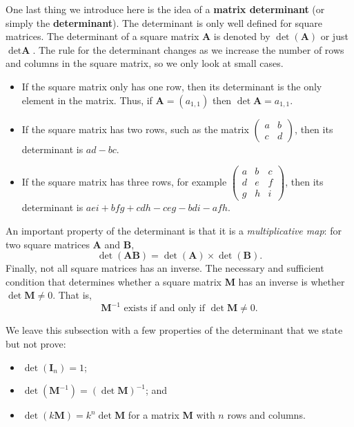 One last thing we introduce here is the idea of a \textbf{matrix determinant} (or simply the \textbf{determinant}). The determinant is only well defined for square matrices. The determinant of a square matrix \textbf{A} is denoted by $\det(\textbf{A})$ or just $\det \textbf{A}$. The rule for the determinant changes as we increase the number of rows and columns in the square matrix, so we only look at small cases.
\begin{itemize}
    \item If the square matrix only has one row, then its determinant is the only element in the matrix. Thus, if $\textbf{A} = (a_{1,1})$ then $\det \textbf{A} = a_{1,1}$.
    \item If the square matrix has two rows, such as the matrix $\begin{pmatrix}a & b\\c & d\end{pmatrix}$, then its determinant is $ad-bc$.
    \item If the square matrix has three rows, for example $\begin{pmatrix}a & b & c \\ d & e & f \\ g & h & i\end{pmatrix}$, then its determinant is $aei+bfg+cdh-ceg-bdi-afh$.
\end{itemize}
An important property of the determinant is that it is a \textit{multiplicative map}: for two square matrices \textbf{A} and \textbf{B},
\[
    \det (\textbf{AB}) = \det(\textbf{A}) \times \det(\textbf{B}).
\]
Finally, not all square matrices has an inverse. The necessary and sufficient condition that determines whether a square matrix \textbf{M} has an inverse is whether $\det \textbf{M} \neq 0$. That is,
\[
    \textbf{M}^{-1} \text{ exists if and only if } \det \textbf{M} \neq 0.
\]

\newpage

We leave this subsection with a few properties of the determinant that we state but not prove:
\begin{itemize}
    \item $\det(\textbf{I}_n) = 1$;
    \item $\det(\textbf{M}^{-1}) = \left(\det \textbf{M}\right)^{-1}$; and
    \item $\det(k\textbf{M}) = k^n \det\textbf{M}$ for a matrix \textbf{M} with $n$ rows and columns.
\end{itemize}

